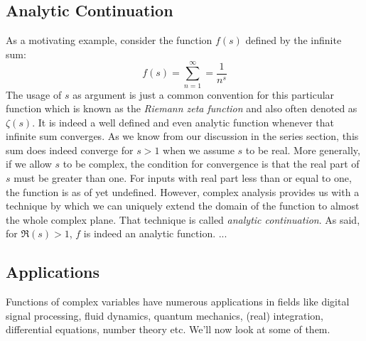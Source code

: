 \subsection{Analytic Continuation}
As a motivating example, consider the function $f(s)$ defined by the infinite sum:
\begin{equation}
f(s) = \sum_{n=1}^{\infty} = \frac{1}{n^s}
\end{equation}
The usage of $s$ as argument is just a common convention for this particular function which is known as the \emph{Riemann zeta function} and also often denoted as $\zeta (s)$. It is indeed a well defined and even analytic function whenever that infinite sum converges. As we know from our discussion in the series section, this sum does indeed converge for $s > 1$ when we assume $s$ to be real. More generally, if we allow $s$ to be complex, the condition for convergence is that the real part of $s$ must be greater than one. For inputs with real part less than or equal to one, the function is as of yet undefined. However, complex analysis provides us with a technique by which we can uniquely extend the domain of the function to almost the whole complex plane. That technique is called \emph{analytic continuation}. As said, for $\Re(s) > 1$, $f$ is indeed an analytic function. ...





\subsection{Applications}
Functions of complex variables have numerous applications in fields like digital signal processing, fluid dynamics, quantum mechanics, (real) integration, differential equations, number theory etc. We'll now look at some of them.

